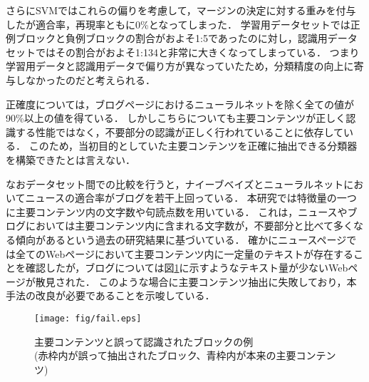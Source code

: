 \documentclass[a4paper,10pt,twocolumn]{jsarticle}
\begin{document}
さらにSVMではこれらの偏りを考慮して，マージンの決定に対する重みを付与したが適合率，再現率ともに0\%となってしまった．
学習用データセットでは正例ブロックと負例ブロックの割合がおよそ1:5であったのに対し，認識用データセットではその割合がおよそ1:134と非常に大きくなってしまっている．
つまり学習用データと認識用データで偏り方が異なっていたため，分類精度の向上に寄与しなかったのだと考えられる．

正確度については，ブログページにおけるニューラルネットを除く全ての値が90\%以上の値を得ている．
しかしこちらについても主要コンテンツが正しく認識する性能ではなく，不要部分の認識が正しく行われていることに依存している．
このため，当初目的としていた主要コンテンツを正確に抽出できる分類器を構築できたとは言えない．

なおデータセット間での比較を行うと，ナイーブベイズとニューラルネットにおいてニュースの適合率がブログを若干上回っている．
本研究では特徴量の一つに主要コンテンツ内の文字数や句読点数を用いている．
これは，ニュースやブログにおいては主要コンテンツ内に含まれる文字数が，不要部分と比べて多くなる傾向があるという過去の研究結果に基づいている．
確かにニュースページでは全てのWebページにおいて主要コンテンツ内に一定量のテキストが存在することを確認したが，ブログについては図\ref{fail}に示すようなテキスト量が少ないWebページが散見された．
このような場合に主要コンテンツ抽出に失敗しており，本手法の改良が必要であることを示唆している．

\begin{figure}[tbh]
\vspace{2mm}
\begin{center}
\texttt{[image: fig/fail.eps]}
\end{center}
\vspace{-6mm}
\caption{主要コンテンツと誤って認識されたブロックの例\\(赤枠内が誤って抽出されたブロック、青枠内が本来の主要コンテンツ)}
\label{fail}
\end{figure}
\vspace{2mm}
\end{document}
